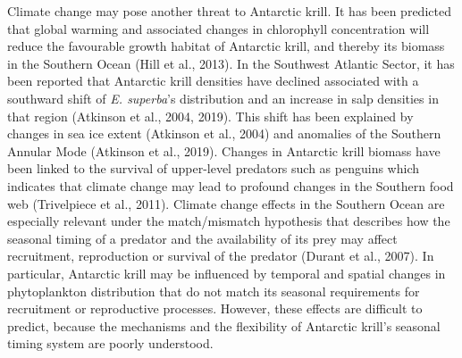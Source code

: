 Climate change may pose another threat to Antarctic krill. It has been predicted that global warming and associated changes in chlorophyll concentration will reduce the favourable growth habitat of Antarctic krill, and thereby its biomass in the Southern Ocean (Hill et al., 2013). In the Southwest Atlantic Sector, it has been reported that Antarctic krill densities have declined associated with a southward shift of \textit{E. superba}'s distribution and an increase in salp densities in that region (Atkinson et al., 2004, 2019). This shift has been explained by changes in sea ice extent (Atkinson et al., 2004) and anomalies of the Southern Annular Mode (Atkinson et al., 2019). Changes in Antarctic krill biomass have been linked to the survival of upper-level predators such as penguins which indicates that climate change may lead to profound changes in the Southern food web (Trivelpiece et al., 2011).
Climate change effects in the Southern Ocean are especially relevant under the match/mismatch hypothesis that describes how the seasonal timing of a predator and the availability of its prey may affect recruitment, reproduction or survival of the predator (Durant et al., 2007). In particular, Antarctic krill may be influenced by temporal and spatial changes in phytoplankton distribution that do not match its seasonal requirements for recruitment or reproductive processes. However, these effects are difficult to predict, because the mechanisms and the flexibility of Antarctic krill's seasonal timing system are poorly understood.

